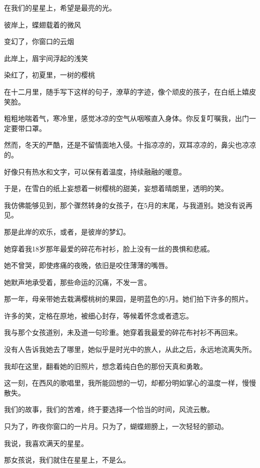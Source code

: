 \documentclass[12pt,a4paper]{article}
\begin{document}
	\endwriting



		\longpoem{}{}{}

		在我们的星星上，希望是最亮的光。

		彼岸上，蝶翅载着的微风

		变幻了，你窗口的云烟

		此岸上，眉宇间浮起的浅笑

		染红了，初夏里，一树的樱桃
		\endlongpoem


		在十二月里，随手写下这样的句子，潦草的字迹，像个顽皮的孩子，在白纸上嬉皮笑脸。

		粗粗地喘着气，寒冷里，感觉冰凉的空气从咽喉直入身体。你反复叮嘱我，出门一定要带口罩。

		然而，冬天的严酷，还是不留情面地入侵。十指凉凉的，双耳凉凉的，鼻尖也凉凉的。


		好像只有热水和文字，可以保有着温度，持续融融的暖意。


		于是，在雪白的纸上妄想着一树樱桃的甜美，妄想着晴朗里，透明的笑。

		我仿佛能够见到，那个骤然转身的女孩子，在5月的末尾，与我道别。她没有说再见。

		那是此岸的欢乐，或者，是彼岸的梦幻。


		她穿着我18岁那年最爱的碎花布衬衫，脸上没有一丝的畏惧和悲戚。

		她不曾哭，即使疼痛的夜晚，依旧是咬住薄薄的嘴唇。

		她默声地承受着，那些命运的沉痛，不发一言。


		那一年，母亲带她去栽满樱桃树的果园，是明蓝色的5月。她们拍下许多的照片。

		许多的笑，定格在原地，被细心封存，等候着怀念或者遗忘。

		我与那个女孩道别，未及道一句珍重。她穿着我最爱的碎花布衬衫不再回来。

		没有人告诉我她去了哪里，她似乎是时光中的旅人，从此之后，永远地流离失所。

		我却在这里，翻看她的旧照片，想念着纯白色的那份天真和勇敢。


		这一刻，在西风的歌唱里，我所能回想的一切，却都分明如掌心的温度一样，慢慢散失。

		我们的故事，我们的苦难，终于要选择一个恰当的时间，风流云散。

		只为了，昨夜你窗口的一片月。只为了，蝴蝶翅膀上，一次轻轻的颤动。


		我说，我喜欢满天的星星。

		那女孩说，我们就住在星星上，不是么。
\end{document}
